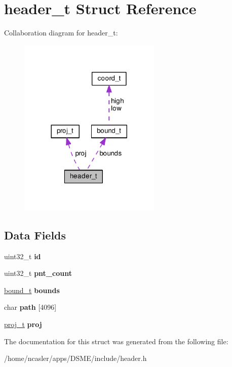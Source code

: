 \hypertarget{structheader__t}{}\section{header\+\_\+t Struct Reference}
\label{structheader__t}


Collaboration diagram for header\+\_\+t\+:\nopagebreak
\begin{figure}[H]
\begin{center}
\leavevmode
\includegraphics[width=192pt]{d6/d71/structheader__t__coll__graph}
\end{center}
\end{figure}
\subsection*{Data Fields}
\begin{DoxyCompactItemize}
\item 
\hypertarget{structheader__t_a68cac7334ce712d0f88f5c07a13ec090}{}uint32\+\_\+t {\bfseries id}\label{structheader__t_a68cac7334ce712d0f88f5c07a13ec090}

\item 
\hypertarget{structheader__t_ae3f01641558524288a8ee112a35f87eb}{}uint32\+\_\+t {\bfseries pnt\+\_\+count}\label{structheader__t_ae3f01641558524288a8ee112a35f87eb}

\item 
\hypertarget{structheader__t_a2f3027c685ecfa452dd1cd8949a1e7ab}{}\hyperlink{structbound__t}{bound\+\_\+t} {\bfseries bounds}\label{structheader__t_a2f3027c685ecfa452dd1cd8949a1e7ab}

\item 
\hypertarget{structheader__t_a771cbcf21e4a66dfb85e48795562ec82}{}char {\bfseries path} \mbox{[}4096\mbox{]}\label{structheader__t_a771cbcf21e4a66dfb85e48795562ec82}

\item 
\hypertarget{structheader__t_a333dff43bf513368d4cb0ede5e6f9f44}{}\hyperlink{structproj__t}{proj\+\_\+t} {\bfseries proj}\label{structheader__t_a333dff43bf513368d4cb0ede5e6f9f44}

\end{DoxyCompactItemize}


The documentation for this struct was generated from the following file\+:\begin{DoxyCompactItemize}
\item 
/home/ncasler/apps/\+D\+S\+M\+E/include/header.\+h\end{DoxyCompactItemize}
